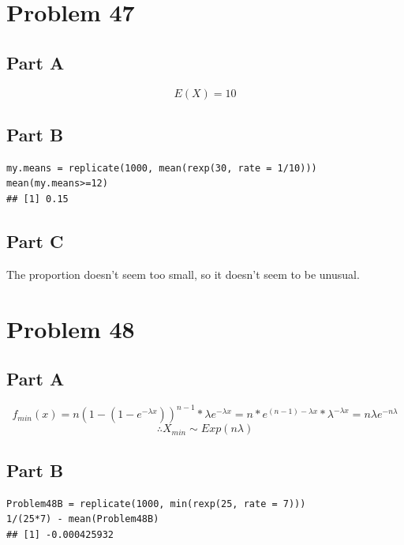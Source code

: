 \documentclass{article}\usepackage[]{graphicx}\usepackage[]{color}
\makeatletter
\newenvironment{kframe}{%
 \def\at@end@of@kframe{}%
 \ifinner\ifhmode%
  \def\at@end@of@kframe{\end{minipage}}%
  \begin{minipage}{\columnwidth}%
 \fi\fi%
 \def\FrameCommand##1{\hskip\@totalleftmargin \hskip-\fboxsep
 \colorbox{shadecolor}{##1}\hskip-\fboxsep
     \hskip-\linewidth \hskip-\@totalleftmargin \hskip\columnwidth}%
 \MakeFramed {\advance\hsize-\width
   \@totalleftmargin\z@ \linewidth\hsize
   \@setminipage}}%
 {\par\unskip\endMakeFramed%
 \at@end@of@kframe}
\newenvironment{knitrout}{}{} %
\makeatother
\begin{document}
\section*{Problem 47}
\subsection*{Part A}
\begin{equation*}
E(X)=10
\end{equation*}
\subsection*{Part B}
\begin{knitrout}
\color{fgcolor}\begin{kframe}
\begin{verbatim}
my.means = replicate(1000, mean(rexp(30, rate = 1/10)))
mean(my.means>=12)
## [1] 0.15
\end{verbatim}
\end{kframe}
\end{knitrout}
\subsection*{Part C}
The proportion doesn't seem too small, so it doesn't seem to be unusual.
\section*{Problem 48}
\subsection*{Part A}
\begin{equation*}
f_{min}(x)=n(1-(1-e^{-\lambda x}))^{n-1}*\lambda e^{-\lambda x}=n*e^{(n-1)-\lambda x}*\lambda^{-\lambda x}=n\lambda e^{-n\lambda}
\end{equation*} 
\begin{equation*}
\therefore X_{min}\sim Exp(n\lambda)
\end{equation*}
\subsection*{Part B}
\begin{knitrout}
\color{fgcolor}\begin{kframe}
\begin{verbatim}
Problem48B = replicate(1000, min(rexp(25, rate = 7)))
1/(25*7) - mean(Problem48B)
## [1] -0.000425932
\end{verbatim}
\end{kframe}
\end{knitrout}
\end{document}
